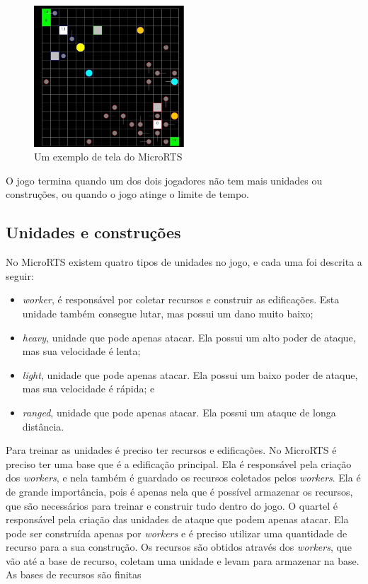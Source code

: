 \begin{figure}[ht]
	\centering
	\includegraphics[width=0.5\textwidth]{fig/microrts.pdf}
	\caption{Um exemplo de tela do MicroRTS}
	\label{fig:microrts}
\end{figure} 

O jogo termina quando um dos dois jogadores não tem mais unidades ou construções, ou quando o jogo atinge o limite de tempo. 

\subsection{Unidades e construções}
No MicroRTS existem quatro tipos de unidades no jogo, e cada uma foi descrita a seguir:

\begin{itemize}
	\item \textit{worker}, é responsável por coletar recursos e construir as edificações. Esta unidade também consegue lutar, mas possui um dano muito baixo;
	\item \textit{heavy}, unidade que pode apenas atacar. Ela possui um alto poder de ataque, mas sua velocidade é lenta;
	\item \textit{light}, unidade que pode apenas atacar. Ela possui um baixo poder de ataque, mas sua velocidade é rápida; e
	\item \textit{ranged}, unidade que pode apenas atacar. Ela possui um ataque de longa distância. 
\end{itemize} 

Para treinar as unidades é preciso ter recursos e edificações. 
No MicroRTS é preciso ter uma base que é a edificação principal. 
Ela é responsável pela criação dos \textit{workers}, e nela também é guardado os recursos coletados pelos \textit{workers}. 
Ela é de grande importância, pois é apenas nela que é possível armazenar os recursos, que são necessários para treinar e construir tudo dentro do jogo. 
O quartel é responsável pela criação das unidades de ataque que podem apenas atacar. 
Ela pode ser construída apenas por \textit{workers} e é preciso utilizar uma quantidade de recurso para a sua construção. 
Os recursos são obtidos através dos \textit{workers}, que vão até a base de recurso, coletam uma unidade e levam para armazenar na base. 
As bases de recursos são finitas

